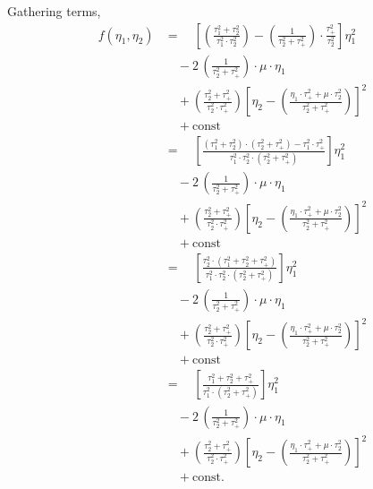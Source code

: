 \documentclass[11pt, oneside]{article}
\begin{document}
%
Gathering terms,
%
\begin{align*}
f(\eta_{1}, \eta_{2})
&= \quad
\left[ \left( \frac{ \tau_{1}^{2} + \tau_{2}^{2} }{ \tau_{1}^{2} \cdot \tau_{2}^{2} } \right) -
\left( \frac{ 1 }{ \tau_{2}^{2} + \tau_{+}^{2} } \right) \cdot
\frac{ \tau_{+}^{2} }{ \tau_{2}^{2} } \right] \eta_{1}^{2}
\\
&\quad -
2 \, \left( \frac{ 1 }{ \tau_{2}^{2} + \tau_{+}^{2} } \right) \cdot \mu \cdot \eta_{1}
\\
&\quad +
\left( \frac{ \tau_{2}^{2} + \tau_{+}^{2} }{ \tau_{2}^{2} \cdot \tau_{+}^{2} } \right)
\left[ \eta_{2} -
\left( \frac{ \eta_{1} \cdot \tau_{+}^{2} + \mu \cdot \tau_{2}^{2} }{ \tau_{2}^{2} + \tau_{+}^{2} } \right) \right]^{2}
\\
&\quad +
\mathrm{const}
\\
&= \quad
\left[ \frac{ ( \tau_{1}^{2} + \tau_{2}^{2} ) \cdot (\tau_{2}^{2} + \tau_{+}^{2})
- \tau_{1}^{2} \cdot \tau_{+}^{2} }
{ \tau_{1}^{2} \cdot \tau_{2}^{2} \cdot (\tau_{2}^{2} + \tau_{+}^{2}) } \right] \eta_{1}^{2}
\\
&\quad -
2 \, \left( \frac{ 1 }{ \tau_{2}^{2} + \tau_{+}^{2} } \right) \cdot \mu \cdot \eta_{1}
\\
&\quad +
\left( \frac{ \tau_{2}^{2} + \tau_{+}^{2} }{ \tau_{2}^{2} \cdot \tau_{+}^{2} } \right)
\left[ \eta_{2} -
\left( \frac{ \eta_{1} \cdot \tau_{+}^{2} + \mu \cdot \tau_{2}^{2} }{ \tau_{2}^{2} + \tau_{+}^{2} } \right) \right]^{2}
\\
&\quad +
\mathrm{const}
\\
&= \quad
\left[ \frac{ \tau_{2}^{2} \cdot ( \tau_{1}^{2} + \tau_{2}^{2} + \tau_{+}^{2} ) }
{ \tau_{1}^{2} \cdot \tau_{2}^{2} \cdot (\tau_{2}^{2} + \tau_{+}^{2}) } \right] \eta_{1}^{2}
\\
&\quad -
2 \, \left( \frac{ 1 }{ \tau_{2}^{2} + \tau_{+}^{2} } \right) \cdot \mu \cdot \eta_{1}
\\
&\quad +
\left( \frac{ \tau_{2}^{2} + \tau_{+}^{2} }{ \tau_{2}^{2} \cdot \tau_{+}^{2} } \right)
\left[ \eta_{2} -
\left( \frac{ \eta_{1} \cdot \tau_{+}^{2} + \mu \cdot \tau_{2}^{2} }{ \tau_{2}^{2} + \tau_{+}^{2} } \right) \right]^{2}
\\
&\quad +
\mathrm{const}
\\
&= \quad
\left[ \frac{ \tau_{1}^{2} + \tau_{2}^{2} + \tau_{+}^{2} }
{ \tau_{1}^{2} \cdot (\tau_{2}^{2} + \tau_{+}^{2}) } \right] \eta_{1}^{2}
\\
&\quad -
2 \, \left( \frac{ 1 }{ \tau_{2}^{2} + \tau_{+}^{2} } \right) \cdot \mu \cdot \eta_{1}
\\
&\quad +
\left( \frac{ \tau_{2}^{2} + \tau_{+}^{2} }{ \tau_{2}^{2} \cdot \tau_{+}^{2} } \right)
\left[ \eta_{2} -
\left( \frac{ \eta_{1} \cdot \tau_{+}^{2} + \mu \cdot \tau_{2}^{2} }{ \tau_{2}^{2} + \tau_{+}^{2} } \right) \right]^{2}
\\
&\quad +
\mathrm{const}.
\end{align*}
\end{document}
